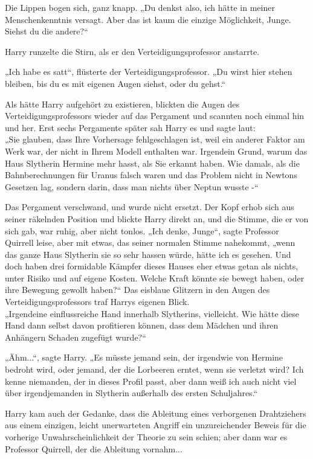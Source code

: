 {Die Lippen bogen sich, ganz knapp. „Du denkst also, ich hätte in meiner Menschenkenntnis versagt. Aber das ist kaum die einzige Möglichkeit, Junge. Siehst du die andere?“

Harry runzelte die Stirn, als er den Verteidigungsprofessor anstarrte.

„Ich habe es satt“, flüsterte der Verteidigungsprofessor. „Du wirst hier stehen bleiben, bis du es mit eigenen Augen siehst, oder du gehst.“

Als hätte Harry aufgehört zu existieren, blickten die Augen des Verteidigungsprofessors wieder auf das Pergament und scannten noch einmal hin und her. Erst sechs Pergamente später sah Harry es und sagte laut:\\ „Sie glauben, dass Ihre Vorhersage fehlgeschlagen ist, weil ein anderer Faktor am Werk war, der nicht in Ihrem Modell enthalten war. Irgendein Grund, warum das Haus Slytherin Hermine mehr hasst, als Sie erkannt haben. Wie damals, als die Bahnberechnungen für Uranus falsch waren und das Problem nicht in Newtons Gesetzen lag, sondern darin, dass man nichts über Neptun wusste -“

Das Pergament verschwand, und wurde nicht ersetzt. Der Kopf erhob sich aus seiner räkelnden Position und blickte Harry direkt an, und die Stimme, die er von sich gab, war ruhig, aber nicht tonlos. „Ich denke, Junge“, sagte Professor Quirrell leise, aber mit etwas, das seiner normalen Stimme nahekommt, „wenn das ganze Haus Slytherin sie so sehr hassen würde, hätte ich es gesehen. Und doch haben drei formidable Kämpfer dieses Hauses eher etwas getan als nichts, unter Risiko und auf eigene Kosten. Welche Kraft könnte sie bewegt haben, oder ihre Bewegung gewollt haben?“ Das eisblaue Glitzern in den Augen des Verteidigungsprofessors traf Harrys eigenen Blick.\\ „Irgendeine einflussreiche Hand innerhalb Slytherins, vielleicht. Wie hätte diese Hand dann selbst davon profitieren können, dass dem Mädchen und ihren Anhängern Schaden zugefügt wurde?“

„Ähm...“, sagte Harry. „Es müsste jemand sein, der irgendwie von Hermine bedroht wird, oder jemand, der die Lorbeeren erntet, wenn sie verletzt wird? Ich kenne niemanden, der in dieses Profil passt, aber dann weiß ich auch nicht viel über irgendjemanden in Slytherin außerhalb des ersten Schuljahres.“

Harry kam auch der Gedanke, dass die Ableitung eines verborgenen Drahtziehers aus einem einzigen, leicht unerwarteten Angriff ein unzureichender Beweis für die vorherige Unwahrscheinlichkeit der Theorie zu sein schien; aber dann war es Professor Quirrell, der die Ableitung vornahm...

}
